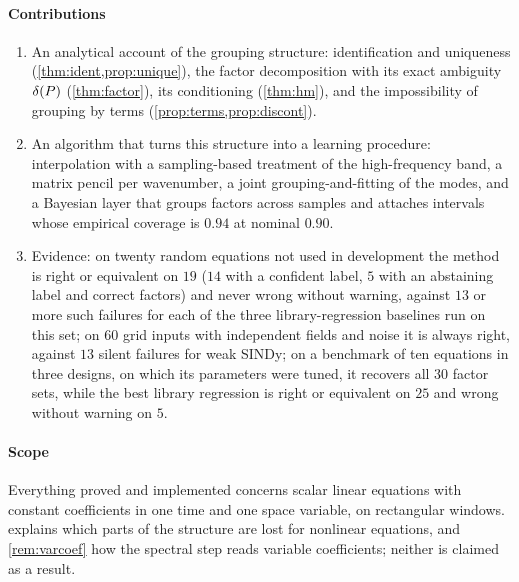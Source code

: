 \paragraph{Contributions}
\begin{enumerate}
  \item An analytical account of the grouping structure: identification and uniqueness (\cref{thm:ident,prop:unique}),
  the factor decomposition with its exact ambiguity $\delta(P)$ (\cref{thm:factor}), its conditioning
  (\cref{thm:hm}), and the impossibility of grouping by terms (\cref{prop:terms,prop:discont}).
  \item An algorithm that turns this structure into a learning procedure: interpolation with a sampling-based
  treatment of the high-frequency band, a matrix pencil per wavenumber, a joint grouping-and-fitting of the modes, and
  a Bayesian layer that groups factors across samples and attaches intervals whose empirical coverage is
  $0.94$ at nominal $0.90$.
  \item Evidence: on twenty random equations not used in development the method is right or equivalent on $19$
  ($14$ with a confident label, $5$ with an abstaining label and correct factors) and never wrong without warning,
  against $13$ or more such failures for each of the three library-regression baselines run on this set; on $60$ grid
  inputs with independent fields and noise it is always right, against $13$ silent failures for weak SINDy; on a
  benchmark of ten equations in three designs, on which its parameters were tuned, it recovers all $30$ factor
  sets, while the best library regression is right or equivalent on $25$ and wrong without warning on $5$.
\end{enumerate}



\paragraph{Scope} Everything proved and implemented concerns scalar linear equations with constant coefficients in one
time and one space variable, on rectangular windows.  explains which parts of the structure are lost
for nonlinear equations, and \cref{rem:varcoef} how the spectral step reads variable coefficients; neither is claimed as a
result.

